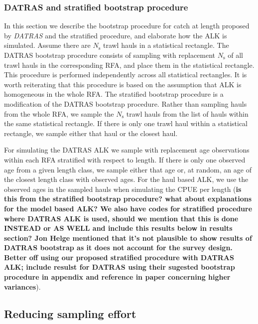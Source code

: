 \documentclass[a4paper 12pt]{article}
\numberwithin{equation}{section}
\begin{document}
\subsubsection{DATRAS and stratified bootstrap procedure}
\label{sec:datrasstratifiedbootstrap}
In this section we describe the bootstrap procedure for catch at length proposed by \emph{DATRAS} \citep{ICES2013} and the stratified procedure, and elaborate how the ALK is simulated. Assume there are $N_{\text{s}}$ trawl hauls in a statistical rectangle. The DATRAS bootstrap procedure consists of sampling with replacement $N_{\text{s}}$ of all trawl hauls in the corresponding RFA, and place them in the statistical rectangle. This procedure is performed independently across all statistical rectangles. It is worth reiterating that this procedure is based on the assumption that ALK is homogeneous in the whole RFA. The stratified bootstrap procedure is a modification of the DATRAS bootstrap procedure. Rather than sampling hauls from the whole RFA, we  sample the $N_{\text{s}}$ trawl hauls from the list of hauls within the same statistical rectangle. If there is only one trawl haul within a statistical rectangle, we sample either that haul or the closest haul.

For simulating the DATRAS ALK we sample with replacement age observations within each RFA stratified with respect to length. If there is only one observed age from a given length class, we sample either that age or, at random, an age of the closest length class with observed ages. For the haul based ALK, we use the observed ages in the sampled hauls when simulating the CPUE per length ({\bf is this from the stratified bootstrap procedure? what about explanations for the model based ALK? We also have codes for stratified procedure where DATRAS ALK is used, should we mention that this is done INSTEAD or AS WELL and include this results below in results section? Jon Helge mentioned that it's not plausible to show results of DATRAS bootstrap as it does not account for the survey design. Better off using our proposed stratified procedure with DATRAS ALK; include resulst for DATRAS using their sugested bootstrap procedure in appendix and reference in paper concerning higher variances}).

\subsection{Reducing sampling effort}
\label{sec:optimizationsampling}
\end{document}
